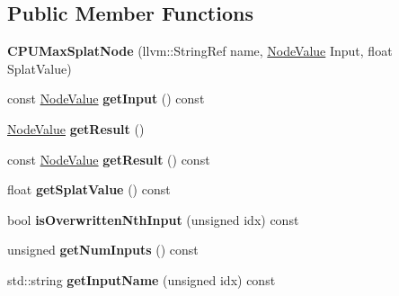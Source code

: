 \subsection*{Public Member Functions}
\begin{DoxyCompactItemize}
\item 
\mbox{\label{classglow_1_1_c_p_u_max_splat_node_a20b2ec23d19203e7166bc9dc3ef08c2c}} 
{\bfseries C\+P\+U\+Max\+Splat\+Node} (llvm\+::\+String\+Ref name, \hyperlink{structglow_1_1_node_value}{Node\+Value} Input, float Splat\+Value)
\item 
\mbox{\label{classglow_1_1_c_p_u_max_splat_node_af769acb2366e6d0e9ba999446b68b3ab}} 
const \hyperlink{structglow_1_1_node_value}{Node\+Value} {\bfseries get\+Input} () const
\item 
\mbox{\label{classglow_1_1_c_p_u_max_splat_node_a0003a229093c199abcc15fce72fba068}} 
\hyperlink{structglow_1_1_node_value}{Node\+Value} {\bfseries get\+Result} ()
\item 
\mbox{\label{classglow_1_1_c_p_u_max_splat_node_a9b35d51db338a347239614d4cd2ce0df}} 
const \hyperlink{structglow_1_1_node_value}{Node\+Value} {\bfseries get\+Result} () const
\item 
\mbox{\label{classglow_1_1_c_p_u_max_splat_node_acf741a0be3d3543918d9b8a00a60ab88}} 
float {\bfseries get\+Splat\+Value} () const
\item 
\mbox{\label{classglow_1_1_c_p_u_max_splat_node_a71d3b37f12ffb8f4737a08c73a3b48fa}} 
bool {\bfseries is\+Overwritten\+Nth\+Input} (unsigned idx) const
\item 
\mbox{\label{classglow_1_1_c_p_u_max_splat_node_a2490d14b2847263949b6969983b02d9d}} 
unsigned {\bfseries get\+Num\+Inputs} () const
\item 
\mbox{\label{classglow_1_1_c_p_u_max_splat_node_afc164754858825a1d42b0f73873b1d46}} 
std\+::string {\bfseries get\+Input\+Name} (unsigned idx) const

\end{DoxyCompactItemize}
